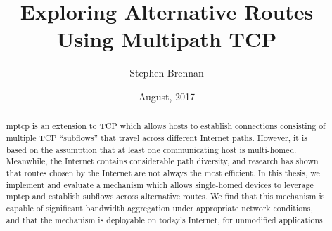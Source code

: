 \documentclass{cwru}
\title{Exploring Alternative Routes Using Multipath TCP}
\author{Stephen Brennan}
\date{August, 2017} %
\begin{document}

%

\maketitle
\makeapprovalsheet

\setcounter{tocdepth}{1}
\frontmatter
\tableofcontents

\cleardoublepage
{}
{}
\listoffigures





\acresetall

\begin{abstract}
  \ac{mptcp} is an extension to TCP which allows hosts to establish connections
  consisting of multiple TCP ``subflows'' that travel across different Internet
  paths. However, it is based on the assumption that at least one communicating
  host is multi-homed. Meanwhile, the Internet contains considerable path
  diversity, and research has shown that routes chosen by the Internet are not
  always the most efficient. In this thesis, we implement and evaluate a
  mechanism which allows single-homed devices to leverage \ac{mptcp} and
  establish subflows across alternative routes. We find that this mechanism is
  capable of significant bandwidth aggregation under appropriate network
  conditions, and that the mechanism is deployable on today's Internet, for
  unmodified applications.
\end{abstract}
\end{document}
